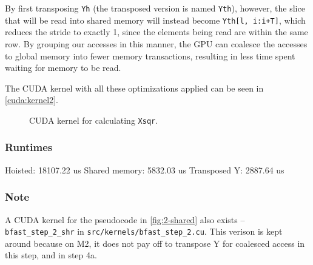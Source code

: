 By first transposing \texttt{Yh} (the transposed version is named
\texttt{Yth}), however, the slice that will be read into shared memory will
instead become \texttt{Yth[l, i:i+T]}, which reduces the stride to exactly 1,
since the elements being read are within the same row.
By grouping our accesses in this manner, the GPU can coalesce the accesses to
global memory into fewer memory transactions, resulting in less time spent
waiting for memory to be read.

The CUDA kernel with all these optimizations applied can be seen in
\autoref{cuda:kernel2}.

\begin{figure}[H]
    \centering
    \caption{CUDA kernel for calculating \texttt{Xsqr}.}
    \label{cuda:kernel2}
\end{figure}

\subsubsection{Runtimes}
Hoisted: 18107.22 us \newline
Shared memory: 5832.03 us \newline
Transposed Y: 2887.64 us \newline

\subsubsection{Note}
A CUDA kernel for the pseudocode in \autoref{fig:2-shared} also exists --
\texttt{bfast\_step\_2\_shr} in \texttt{src/kernels/bfast\_step\_2.cu}.
This verison is kept around because on M2, it does not pay off to transpose Y
for coalesced access in this step, and in step 4a.


%
%
%
%
%
%
%
%
%






